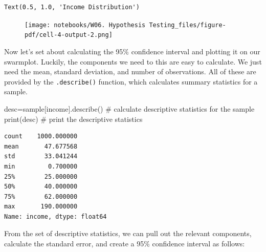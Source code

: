 \documentclass[
  letterpaper,
  DIV=11,
  numbers=noendperiod]{scrreprt}
\newenvironment{Shaded}{\begin{snugshade}}{\end{snugshade}}
\newcommand{\BuiltInTok}[1]{\textcolor[rgb]{0.00,0.23,0.31}{#1}}
\newcommand{\CommentTok}[1]{\textcolor[rgb]{0.37,0.37,0.37}{#1}}
\newcommand{\NormalTok}[1]{\textcolor[rgb]{0.00,0.23,0.31}{#1}}
\newcommand{\OperatorTok}[1]{\textcolor[rgb]{0.37,0.37,0.37}{#1}}
\newcommand{\StringTok}[1]{\textcolor[rgb]{0.13,0.47,0.30}{#1}}
\begin{document}
\begin{verbatim}
Text(0.5, 1.0, 'Income Distribution')
\end{verbatim}

\begin{figure}[H]

{\centering \texttt{[image: notebooks/W06. Hypothesis Testing\_files/figure-pdf/cell-4-output-2.png]}

}

\end{figure}

Now let's set about calculating the 95\% confidence interval and
plotting it on our swarmplot. Luckily, the components we need to this
are easy to calculate. We just need the mean, standard deviation, and
number of observations. All of these are provided by the
\texttt{.describe()} function, which calculates summary statistics for a
sample.

\begin{Shaded}
\begin{Highlighting}[]
\NormalTok{desc}\OperatorTok{=}\NormalTok{sample[}\StringTok{\textquotesingle{}income\textquotesingle{}}\NormalTok{].describe() }\CommentTok{\# calculate descriptive statistics for the sample}
\BuiltInTok{print}\NormalTok{(desc) }\CommentTok{\# print the descriptive statistics}
\end{Highlighting}
\end{Shaded}

\begin{verbatim}
count    1000.000000
mean       47.677568
std        33.041244
min         0.700000
25%        25.000000
50%        40.000000
75%        62.000000
max       190.000000
Name: income, dtype: float64
\end{verbatim}

From the set of descriptive statistics, we can pull out the relevant
components, calculate the standard error, and create a 95\% confidence
interval as follows:
\end{document}
